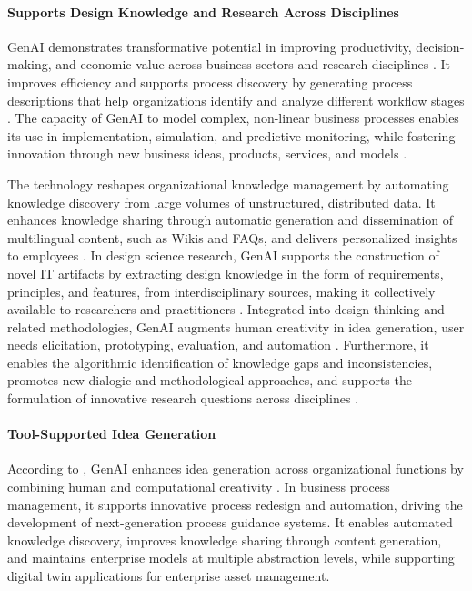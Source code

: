 \paragraph{Supports Design Knowledge and Research Across Disciplines}
GenAI demonstrates transformative potential in improving productivity, decision-making, and economic value across business sectors and research disciplines \parencite{R01}. It improves efficiency \parencite{R03} and supports process discovery by generating process descriptions that help organizations identify and analyze different workflow stages \parencite{R04}. The capacity of GenAI to model complex, non-linear business processes enables its use in implementation, simulation, and predictive monitoring, while fostering innovation through new business ideas, products, services, and models \parencite{R04}.

The technology reshapes organizational knowledge management by automating knowledge discovery from large volumes of unstructured, distributed data. It enhances knowledge sharing through automatic generation and dissemination of multilingual content, such as Wikis and FAQs, and delivers personalized insights to employees \parencite{R04}. In design science research, GenAI supports the construction of novel IT artifacts by extracting design knowledge in the form of requirements, principles, and features, from interdisciplinary sources, making it collectively available to researchers and practitioners \parencite{R04}. Integrated into design thinking and related methodologies, GenAI augments human creativity in idea generation, user needs elicitation, prototyping, evaluation, and automation \parencite{R04}. Furthermore, it enables the algorithmic identification of knowledge gaps and inconsistencies, promotes new dialogic and methodological approaches, and supports the formulation of innovative research questions across disciplines \parencite{R06,S02}.

\paragraph{Tool-Supported Idea Generation}
According to \citeauthor{R04}, GenAI enhances idea generation across organizational functions by combining human and computational creativity \parencite*{R04}. In business process management, it supports innovative process redesign and automation, driving the development of next-generation process guidance systems. It enables automated knowledge discovery, improves knowledge sharing through content generation, and maintains enterprise models at multiple abstraction levels, while supporting digital twin applications for enterprise asset management.

